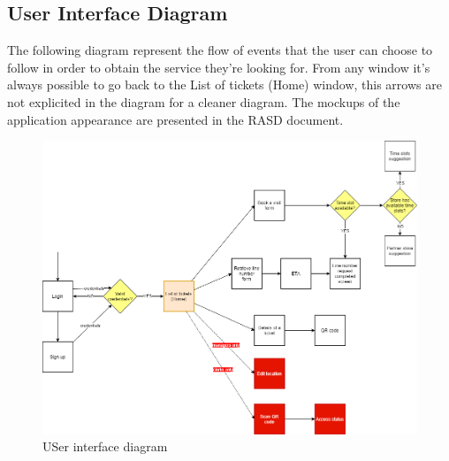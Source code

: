 \subsection{User Interface Diagram}

The following diagram represent the flow of events that the user can choose to follow in order to obtain the service they're looking for.
From any window it's always possible to go back to the List of tickets (Home) window, this arrows are not explicited in the diagram for a cleaner diagram.
The mockups of the application appearance are presented in the RASD document.

\begin{figure}[H]
    \centering
    \includegraphics[height=0.4\textwidth]{Images/UXDiagram.png}
    \caption{USer interface diagram}
\end{figure}
